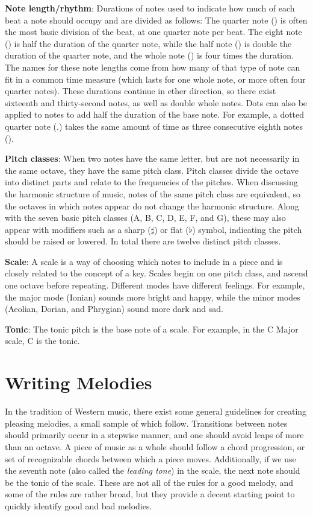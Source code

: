 \textbf{Note length/rhythm}: Durations of notes used to indicate how much of each beat a note should occupy and are divided as follows:
The quarter note (\quarternote) is often the most basic division of the beat, at one quarter note per beat.
The eight note (\eighthnote) is half the duration of the quarter note, while the half note (\halfnote) is double the duration of the quarter note, and the whole note (\fullnote) is four times the duration.
The names for these note lengths come from how many of that type of note can fit in a common time measure (which lasts for one whole note, or more often four quarter notes).
These durations continue in ether direction, so there exist sixteenth and thirty-second notes, as well as double whole notes.
Dots can also be applied to notes to add half the duration of the base note.
For example, a dotted quarter note (\quarternote.) takes the same amount of time as three consecutive eighth notes (\eighthnote \eighthnote \eighthnote).

\textbf{Pitch classes}: When two notes have the same letter, but are not necessarily in the same octave, they have the same pitch class.
Pitch classes divide the octave into distinct parts and relate to the frequencies of the pitches.
When discussing the harmonic structure of music, notes of the same pitch class are equivalent, so the octaves in which notes appear do not change the harmonic structure.
Along with the seven basic pitch classes (A, B, C, D, E, F, and G), these may also appear with modifiers such as a sharp ($\sharp$) or flat ($\flat$) symbol, indicating the pitch should be raised or lowered.
In total there are twelve distinct pitch classes.

\textbf{Scale}: A scale is a way of choosing which notes to include in a piece and is closely related to the concept of a key.
Scales begin on one pitch class, and ascend one octave before repeating.
Different modes have different feelings.
For example, the major mode (Ionian) sounds more bright and happy, while the minor modes (Aeolian, Dorian, and Phrygian) sound more dark and sad.

\textbf{Tonic}: The tonic pitch is the base note of a scale.
For example, in the C Major scale, C is the tonic.

\section{Writing Melodies} \label{bg:writingmelodies}

In the tradition of Western music, there exist some general guidelines for creating pleasing melodies, a small sample of which follow.
Transitions between notes should primarily occur in a stepwise manner, and one should avoid leaps of more than an octave.
A piece of music as a whole should follow a chord progression, or set of recognizable chords between which a piece moves.
Additionally, if we use the seventh note (also called the \textit{leading tone}) in the scale, the next note should be the tonic of the scale.
These are not all of the rules for a good melody, and some of the rules are rather broad, but they provide a decent starting point to quickly identify good and bad melodies.

